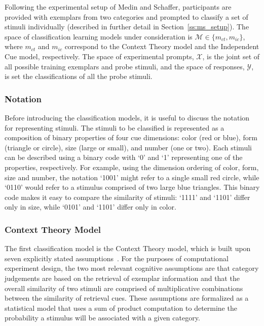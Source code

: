 \documentclass{article}
\begin{document}
Following the experimental setup of Medin and Schaffer, participants are provided with exemplars from two categories and prompted to classify a set of stimuli individually (described in further detail in Section~\ref{ss:ms_setup}). The space of classification learning models under consideration is $\mathcal{M} \in \{m_{ct}, m_{ic}\}$, where $m_{ct}$ and $m_{ic}$ correspond to the Context Theory model and the Independent Cue model, respectively. The space of experimental prompts, $\mathcal{X}$, is the joint set of all possible training exemplars and probe stimuli, and the space of responses, $\mathcal{Y}$, is set the classifications of all the probe stimuli.

\subsubsection{Notation}

Before introducing the classification models, it is useful to discuss the notation for representing stimuli. The stimuli to be classified is represented as a composition of binary properties of four cue dimensions: color (red or blue), form (triangle or circle), size (large or small), and number (one or two). Each stimuli can be described using a binary code with `0' and `1' representing one of the properties, respectively. For example, using the dimension ordering of color, form, size and number, the notation `1001' might refer to a single small red circle, while `0110' would refer to a stimulus comprised of two large blue triangles. This binary code makes it easy to compare the similarity of stimuli: `1111' and `1101' differ only in size, while `0101' and `1101' differ only in color. 

\subsubsection{Context Theory Model}

The first classification model is the Context Theory model, which is built upon seven explicitly stated assumptions~\cite{medin78:pr}. For the purposes of computational experiment design, the two most relevant cognitive assumptions are that category judgements are based on the retrieval of exemplar information and that the overall similarity of two stimuli are comprised of multiplicative combinations between the similarity of retrieval cues. These assumptions are formalized as a statistical model that uses a sum of product computation to determine the probability a stimulus will be associated with a given category.
\end{document}
